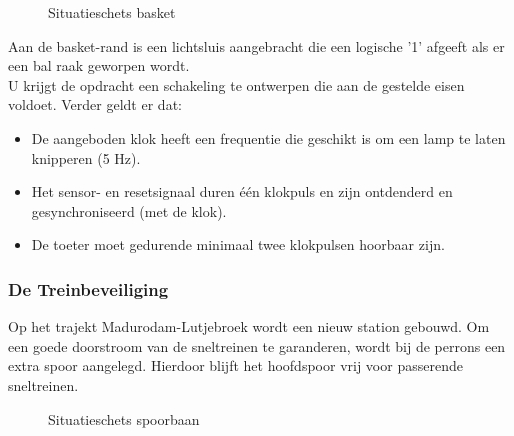 \begin{figure}[bth]
\centerline{}
\caption{Situatieschets basket}
\end{figure}

Aan de basket-rand is een lichtsluis aangebracht die een logi\-sche '1'
afgeeft als er een bal raak geworpen wordt.\\
U krijgt de opdracht een schakeling te ontwerpen die aan de
gestelde eisen voldoet. Verder geldt er dat:
\begin{itemize}
\item
De aangeboden klok heeft een frequentie die geschikt is om een lamp
te laten knipperen (5 Hz).
\item
Het sensor- en resetsignaal duren \'e\'en klokpuls
en zijn ontdenderd en gesynchroniseerd (met de klok).
\item
De toeter moet gedurende minimaal twee klokpulsen hoorbaar zijn.
\end{itemize}

\clearpage

\subsubsection{De Treinbeveiliging}
Op het trajekt Madurodam-Lutjebroek wordt een nieuw station gebouwd.
Om een goede doorstroom van de sneltreinen te garanderen,
wordt bij de perrons een extra spoor aangelegd. Hierdoor 
blijft het hoofdspoor vrij voor passerende sneltreinen.\\

\begin{figure}[bth]
\centerline{}
\caption{Situatieschets spoorbaan}
\end{figure}

